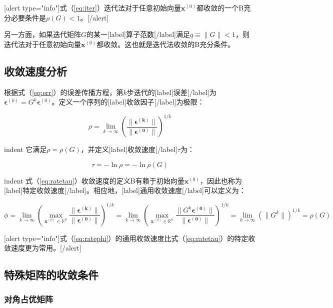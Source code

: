 \documentclass[UTF8,nofonts]{ctexart}
\begin{document}
[alert type="info"]式（\ref{eq:iter}）迭代法对于任意初始向量$\boldsymbol{x}^{(0)}$都收敛的一个B充分必要条件是$\rho(G)<1$。[/alert]

另一方面，如果迭代矩阵$G$的某一[label]算子范数[/label]满足$q\equiv\|G\|<1$，则迭代法对于任意初始向量$\boldsymbol{x}^{(0)}$都收敛。这也就是迭代法收敛的B充分条件。

\subsection*{收敛速度分析}

根据式（\ref{eq:err}）的误差传播方程，第$k$步迭代的[label]误差[/label]为$\boldsymbol{\epsilon}^{(k)}=G^{k}\boldsymbol{\epsilon}^{(0)}$。定义一个序列的[label]收敛因子[/label]为极限：

\[\rho=\lim_{k\to\infty}\left(\dfrac{\|\boldsymbol{\epsilon^{(k)}}\|}{\|\boldsymbol{\epsilon^{(0)}}\|}\right)^{1/k}\]

indent 它满足$\rho=\rho(G)$，并定义[label]收敛速度[/label]$\tau$为：

\begin{equation}
\label{eq:ratetau}
\tau=-\ln\rho=-\ln\rho(G)
\end{equation}

indent 式（\ref{eq:ratetau}）收敛速度的定义B有赖于初始向量$\boldsymbol{x}^{(0)}$，因此也称为[label]特定收敛速度[/label]。相应地，[label]通用收敛速度[/label]可以定义为：

\begin{equation}
\label{eq:ratephi}
\phi=\lim_{k\to\infty}\left(\max_{\boldsymbol{x}^{(0)}\in\mathbb{R}^n}\dfrac{\|\boldsymbol{\epsilon^{(k)}}\|}{\|\boldsymbol{\epsilon^{(0)}}\|}\right)^{1/k}=\lim_{k\to\infty}\left(\max_{\boldsymbol{x}^{(0)}\in\mathbb{R}^n}\dfrac{\|G^k\boldsymbol{\epsilon^{(0)}}\|}{\|\boldsymbol{\epsilon^{(0)}}\|}\right)^{1/k}=\lim_{k\to\infty}\left(\|G^{k}\|\right)^{1/k}=\rho(G)
\end{equation}

[alert type="info"]式（\ref{eq:ratephi}）的通用收敛速度比式（\ref{eq:ratetau}）的特定收敛速度更为常用。[/alert]

\subsection*{特殊矩阵的收敛条件}

\subsubsection*{对角占优矩阵}
\end{document}

